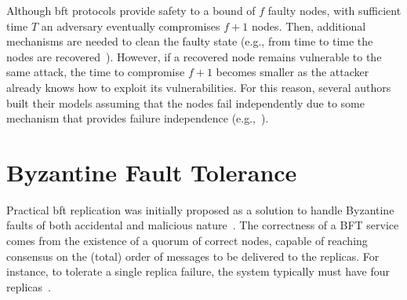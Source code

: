 Although \gls{bft} protocols provide safety to a bound of $f$ faulty nodes, with sufficient time $T$ an adversary eventually compromises $f+1$ nodes.
Then, additional mechanisms are needed to clean the faulty state (e.g., from time to time the nodes are recovered~\cite{Castro:2002}).
However, if a recovered node remains vulnerable to the same attack, the time to compromise $f+1$ becomes smaller as the attacker already knows how to exploit its vulnerabilities.
For this reason, several authors built their models assuming that the nodes fail independently due to some mechanism that provides failure independence (e.g.,~\cite{Castro:2002,Veronese:2013,Sousa:2010}).


\section{Byzantine Fault Tolerance}

Practical \gls{bft} replication was initially proposed as a solution to handle Byzantine faults of both accidental and malicious nature~\cite{Castro:1999}.
The correctness of a BFT service comes from the existence of a quorum of correct nodes, capable of reaching consensus on the (total) order of messages to be delivered to the replicas.
For instance, to tolerate a single replica failure, the system typically must have four replicas~\cite{Castro:2002,Kotla:2010,Aublin:2015}. 

